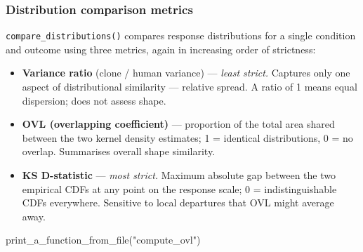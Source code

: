 \documentclass[
  letterpaper,
  DIV=11,
  numbers=noendperiod]{scrartcl}
\newenvironment{Shaded}{\begin{snugshade}}{\end{snugshade}}
\newcommand{\AttributeTok}[1]{\textcolor[rgb]{0.40,0.45,0.13}{#1}}
\newcommand{\CommentTok}[1]{\textcolor[rgb]{0.37,0.37,0.37}{#1}}
\newcommand{\ConstantTok}[1]{\textcolor[rgb]{0.56,0.35,0.01}{#1}}
\newcommand{\ControlFlowTok}[1]{\textcolor[rgb]{0.00,0.23,0.31}{\textbf{#1}}}
\newcommand{\DecValTok}[1]{\textcolor[rgb]{0.68,0.00,0.00}{#1}}
\newcommand{\FunctionTok}[1]{\textcolor[rgb]{0.28,0.35,0.67}{#1}}
\newcommand{\NormalTok}[1]{\textcolor[rgb]{0.00,0.23,0.31}{#1}}
\newcommand{\OtherTok}[1]{\textcolor[rgb]{0.00,0.23,0.31}{#1}}
\newcommand{\SpecialCharTok}[1]{\textcolor[rgb]{0.37,0.37,0.37}{#1}}
\newcommand{\StringTok}[1]{\textcolor[rgb]{0.13,0.47,0.30}{#1}}
\providecommand{\tightlist}{%
  \setlength{\itemsep}{0pt}\setlength{\parskip}{0pt}}
\begin{document}
\subsubsection{Distribution comparison
metrics}\label{distribution-comparison-metrics}

\texttt{compare\_distributions()} compares response distributions for a
single condition and outcome using three metrics, again in increasing
order of strictness:

\begin{itemize}
\tightlist
\item
  \textbf{Variance ratio} (clone / human variance) --- \emph{least
  strict.} Captures only one aspect of distributional similarity ---
  relative spread. A ratio of 1 means equal dispersion; does not assess
  shape.
\item
  \textbf{OVL (overlapping coefficient)} --- proportion of the total
  area shared between the two kernel density estimates; 1 = identical
  distributions, 0 = no overlap. Summarises overall shape similarity.
\item
  \textbf{KS D-statistic} --- \emph{most strict.} Maximum absolute gap
  between the two empirical CDFs at any point on the response scale; 0 =
  indistinguishable CDFs everywhere. Sensitive to local departures that
  OVL might average away.
\end{itemize}

\begin{Shaded}
\begin{Highlighting}[]
\FunctionTok{print\_a\_function\_from\_file}\NormalTok{(}\StringTok{"compute\_ovl"}\NormalTok{)}
\end{Highlighting}
\end{Shaded}

\begin{Shaded}
\end{Shaded}
\end{document}
